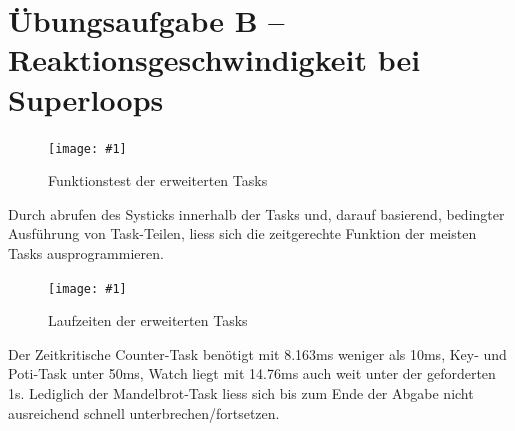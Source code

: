 \documentclass{article}
\newcommand{\bild}[3]{\begin{figure}[h!]		\begin{center}			\texttt{[image: \#1]}			\caption{#2}		\end{center}	\end{figure}}
\begin{document}
\section{Übungsaufgabe B – Reaktionsgeschwindigkeit bei Superloops}
\bild{RTO1_UE1_APUS}{Funktionstest der erweiterten Tasks}{width=0.8\textwidth}
Durch abrufen des Systicks innerhalb der Tasks und, darauf basierend, bedingter Ausführung von Task-Teilen, liess sich die zeitgerechte Funktion der meisten Tasks ausprogrammieren.
\bild{04_TeilB}{Laufzeiten der erweiterten Tasks}{width=\textwidth}
Der Zeitkritische Counter-Task benötigt mit 8.163ms weniger als 10ms, Key- und Poti-Task unter 50ms, Watch liegt mit 14.76ms auch weit unter der geforderten 1s. Lediglich der Mandelbrot-Task liess sich bis zum Ende der Abgabe nicht ausreichend schnell unterbrechen/fortsetzen.
\end{document}
